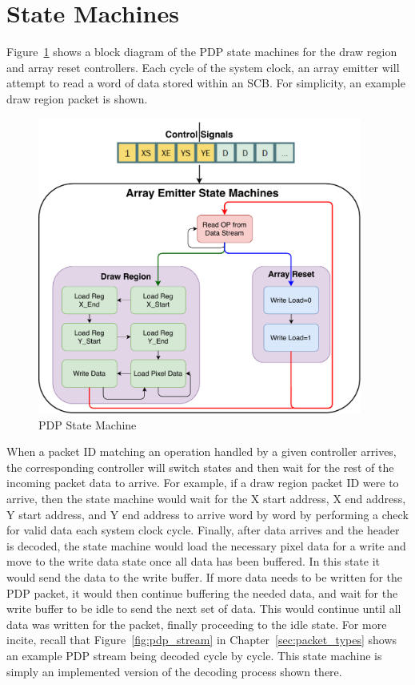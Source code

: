 \section{State Machines}
    \label{sec:state_machines}
    Figure~\ref{fig:state_machine} shows a block diagram of the PDP state machines for the draw region and array reset controllers. Each cycle of the system clock, an array emitter will attempt to read a word of data stored within an SCB. For simplicity, an example draw region packet is shown.

    \begin{figure}[t]
        \centering
        \includegraphics[width=0.95\textwidth]{fig/pdp_state_machine.pdf}
        \caption{PDP State Machine}
        \label{fig:state_machine}
    \end{figure}


    When a packet ID matching an operation handled by a given controller arrives, the corresponding controller will switch states and then wait for the rest of the incoming packet data to arrive. For example, if a draw region packet ID were to arrive, then the state machine would wait for the X start address, X end address, Y start address, and Y end address to arrive word by word by performing a check for valid data each system clock cycle. Finally, after data arrives and the header is decoded, the state machine would load the necessary pixel data for a write and move to the write data state once all data has been buffered. In this state it would send the data to the write buffer. If more data needs to be written for the PDP packet, it would then continue buffering the needed data, and wait for the write buffer to be idle to send the next set of data. This would continue until all data was written for the packet, finally proceeding to the idle state. For more incite, recall that Figure~\ref{fig:pdp_stream} in Chapter~\ref{sec:packet_types} shows an example PDP stream being decoded cycle by cycle. This state machine is simply an implemented version of the decoding process shown there.

